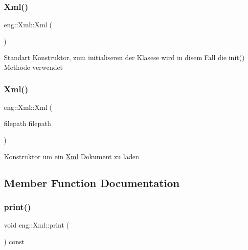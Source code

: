 \subsubsection{\texorpdfstring{Xml()}{Xml()}\hspace{0.1cm}{\footnotesize\ttfamily [1/2]}}
{\footnotesize\ttfamily eng\+::\+Xml\+::\+Xml (\begin{DoxyParamCaption}{ }\end{DoxyParamCaption})\hspace{0.3cm}{\ttfamily [inline]}}

Standart Konstruktor, zum initialiseren der Klasese wird in disem Fall die init() Methode verwendet \mbox{\label{classeng_1_1_xml_abc3374e37afa320f54d5ed1a02a3ba32}} 
\subsubsection{\texorpdfstring{Xml()}{Xml()}\hspace{0.1cm}{\footnotesize\ttfamily [2/2]}}
{\footnotesize\ttfamily eng\+::\+Xml\+::\+Xml (\begin{DoxyParamCaption}\item[{filepath}]{filepath }\end{DoxyParamCaption})\hspace{0.3cm}{\ttfamily [inline]}}

Konstruktor um ein \hyperlink{classeng_1_1_xml}{Xml} Dokument zu laden 

\subsection{Member Function Documentation}
\mbox{\label{classeng_1_1_xml_a2906a7cf0f42524ba941570fb33aa6e4}} 
\subsubsection{\texorpdfstring{print()}{print()}}
{\footnotesize\ttfamily void eng\+::\+Xml\+::print (\begin{DoxyParamCaption}{ }\end{DoxyParamCaption}) const\hspace{0.3cm}{\ttfamily [inline]}}

